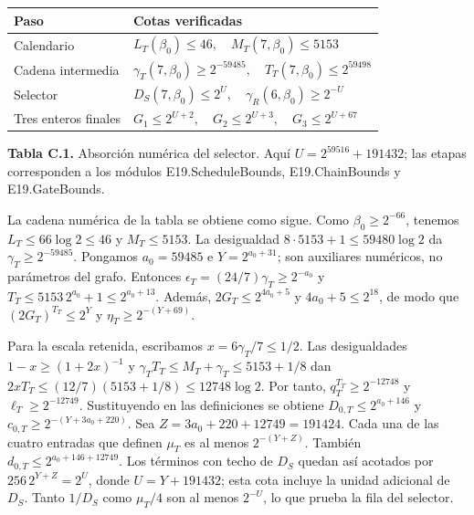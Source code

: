 \documentclass[spanish,11pt,a4paper]{article}
\newcounter{none}
\begin{document}

{\def\LTcaptype{none} %
\begin{longtable}[c]{@{}
  >{\raggedright\arraybackslash}p{}
  >{\raggedright\arraybackslash}p{}@{}}
\toprule\noalign{}
\begin{minipage}[b]{\linewidth}\raggedright
Paso
\end{minipage} & \begin{minipage}[b]{\linewidth}\raggedright
Cotas verificadas
\end{minipage} \\
\midrule\noalign{}
\endhead
\bottomrule\noalign{}
\endlastfoot
Calendario & \(L_T(\beta_0)\le46,\quad M_T(7,\beta_0)\le5153\) \\
Cadena intermedia & \(\gamma_T(7,\beta_0)\ge2^{-59485},\quad T_T(7,\beta_0)\le2^{59498}\) \\
Selector & \(D_S(7,\beta_0)\le2^U,\quad \gamma_R(6,\beta_0)\ge2^{-U}\) \\
Tres enteros finales & \(G_1\le2^{U+2},\quad G_2\le2^{U+3},\quad G_3\le2^{U+67}\) \\
\end{longtable}
}

\textbf{Tabla C.1.} Absorción numérica del selector. Aquí \(U=2^{59516}+191432\); las etapas corresponden a los módulos {\ttfamily\small E19.\discretionary{\hbox{\ensuremath{\hookrightarrow}}}{}{}ScheduleBoun\discretionary{\hbox{\ensuremath{\hookrightarrow}}}{}{}ds}, {\ttfamily\small E19.\discretionary{\hbox{\ensuremath{\hookrightarrow}}}{}{}ChainBounds} y {\ttfamily\small E19.\discretionary{\hbox{\ensuremath{\hookrightarrow}}}{}{}GateBounds}.

La cadena numérica de la tabla se obtiene como sigue. Como \(\beta_0\ge2^{-66}\), tenemos \(L_T\le66\log2\le46\) y \(M_T\le5153\). La desigualdad \(8\cdot5153+1\le59480\log2\) da \(\gamma_T\ge2^{-59485}\). Pongamos \(a_0=59485\) e \(Y=2^{a_0+31}\); son auxiliares numéricos, no parámetros del grafo. Entonces \(\epsilon_T=(24/7)\gamma_T\ge2^{-a_0}\) y \(T_T\le5153\,2^{a_0}+1\le2^{a_0+13}\). Además, \(2G_T\le2^{4a_0+5}\) y \(4a_0+5\le2^{18}\), de modo que \((2G_T)^{T_T}\le2^Y\) y \(\eta_T\ge2^{-(Y+69)}\).

Para la escala retenida, escribamos \(x=6\gamma_T/7\le1/2\). Las desigualdades \(1-x\ge(1+2x)^{-1}\) y \(\gamma_TT_T\le M_T+\gamma_T\le5153+1/8\) dan \(2xT_T\le(12/7)(5153+1/8)\le12748\log2\). Por tanto, \(q_T^{T_T}\ge2^{-12748}\) y \(\ell_T\ge2^{-12749}\). Sustituyendo en las definiciones se obtiene \(D_{0,T}\le2^{a_0+146}\) y \(c_{0,T}\ge2^{-(Y+3a_0+220)}\). Sea \(Z=3a_0+220+12749=191424\). Cada una de las cuatro entradas que definen \(\mu_T\) es al menos \(2^{-(Y+Z)}\). También \(d_{0,T}\le2^{a_0+146+12749}\). Los términos con techo de \(D_S\) quedan así acotados por \(256\,2^{Y+Z}=2^U\), donde \(U=Y+191432\); esta cota incluye la unidad adicional de \(D_S\). Tanto \(1/D_S\) como \(\mu_T/4\) son al menos \(2^{-U}\), lo que prueba la fila del selector.
\end{document}
